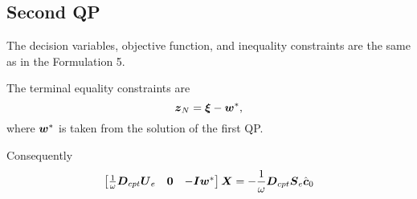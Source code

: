 
\subsection{Second QP}
The decision variables, objective function, and inequality constraints are
the same as in the Formulation 5.

The terminal equality constraints are
\begin{equation*}
    \mbox{\boldmath $z$}_N = \mbox{\boldmath $\xi$} - \mbox{\boldmath $w$}^{*},
\end{equation*}
where $\mbox{\boldmath $w$}^{*}$ is taken from the solution of the first QP.

Consequently
\begin{align*}
    \begin{bmatrix}
        \frac{1}{\omega}\mbox{\boldmath $D$}_{cpt} \mbox{\boldmath $U$}_e     &   \mbox{\boldmath $0$}   &   -\mbox{\boldmath $I$}\mbox{\boldmath $w$}^{*}\\
    \end{bmatrix}
    \mbox{\boldmath $X$}
    = -\frac{1}{\omega}\mbox{\boldmath $D$}_{cpt} \mbox{\boldmath $S$}_e \hat{\mbox{\boldmath $c$}}_0
\end{align*}
